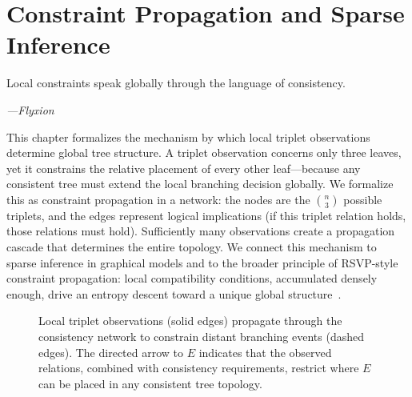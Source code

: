 \chapter{Constraint Propagation and Sparse Inference}
\label{ch:constraint_prop}

\epigraph{%
  Local constraints speak globally through the language of consistency.%
}{\textit{---Flyxion}}

This chapter formalizes the mechanism by which local triplet observations determine global tree structure. A triplet observation concerns only three leaves, yet it constrains the relative placement of every other leaf---because any consistent tree must extend the local branching decision globally. We formalize this as constraint propagation in a network: the nodes are the $\binom{n}{3}$ possible triplets, and the edges represent logical implications (if this triplet relation holds, those relations must hold). Sufficiently many observations create a propagation cascade that determines the entire topology. We connect this mechanism to sparse inference in graphical models and to the broader principle of RSVP-style constraint propagation: local compatibility conditions, accumulated densely enough, drive an entropy descent toward a unique global structure~\cite{Semple2003}.

\begin{figure}[ht]
\centering
{}
\caption{Local triplet observations (solid edges) propagate through the consistency network to constrain distant branching events (dashed edges). The directed arrow to $E$ indicates that the observed relations, combined with consistency requirements, restrict where $E$ can be placed in any consistent tree topology.}
\label{fig:constraint_propagation}
\end{figure}

